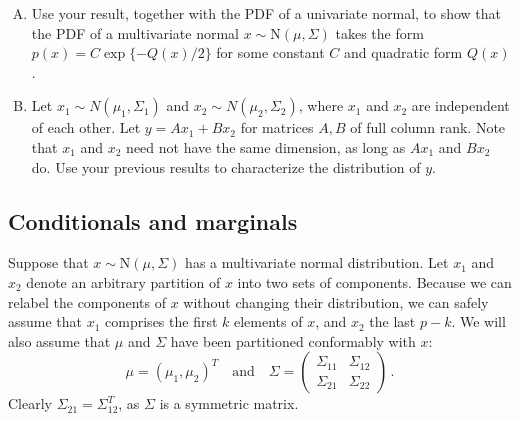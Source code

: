 \documentclass{mynotes}
\newcommand{\N}{\mbox{N}}
\begin{document}
\begin{enumerate}[(A)]
\item Use your result, together with the PDF of a univariate normal, to show that the PDF of a multivariate normal $x \sim \N(\mu, \Sigma)$ takes the form $p(x) = C \exp\{-Q(x)/2\}$ for some constant $C$ and quadratic form $Q(x)$.


\item Let $x_1 \sim N(\mu_1, \Sigma_1)$ and $x_2 \sim N(\mu_2, \Sigma_2)$, where $x_1$ and $x_2$ are independent of each other.  Let $y = A x_1 + B x_2$ for matrices $A,B$ of full column rank.  Note that $x_1$ and $x_2$ need not have the same dimension, as long as $A x_1$ and $B x_2$ do.  Use your previous results to characterize the distribution of $y$.

\end{enumerate}

\subsection{Conditionals and marginals}

Suppose that $x \sim \N(\mu, \Sigma)$ has a multivariate normal distribution.  Let $x_1$ and $x_2$ denote an arbitrary partition of $x$ into two sets of components.  Because we can relabel the components of $x$ without changing their distribution, we can safely assume that $x_1$ comprises the first $k$ elements of $x$, and $x_2$ the last $p-k$.  We will also assume that $\mu$ and $\Sigma$ have been partitioned conformably with $x$:
$$
\mu = (\mu_1, \mu_2)^T \quad \mbox{and} \quad \Sigma =
\left(
\begin{array}{cc}
\Sigma_{11} & \Sigma_{12} \\
\Sigma_{21} & \Sigma_{22} 
\end{array}
\right) \, .
$$
Clearly $\Sigma_{21} = \Sigma_{12}^T$, as $\Sigma$ is a symmetric matrix.
\end{document}
